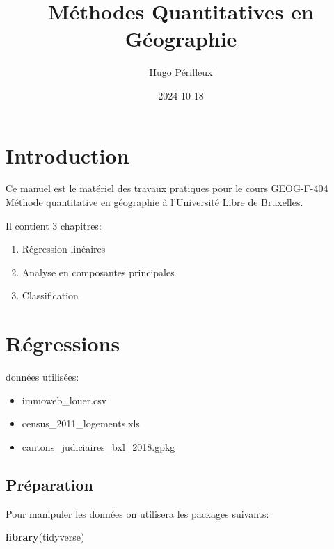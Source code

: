 \documentclass[
]{book}
\title{Méthodes Quantitatives en Géographie}
\author{Hugo Périlleux}
\date{2024-10-18}
\newenvironment{Shaded}{\begin{snugshade}}{\end{snugshade}}
\newcommand{\FunctionTok}[1]{\textcolor[rgb]{0.13,0.29,0.53}{\textbf{#1}}}
\newcommand{\NormalTok}[1]{#1}
\begin{document}
\maketitle

{
\setcounter{tocdepth}{1}
\tableofcontents
}
\hypertarget{introduction}{%
\chapter*{Introduction}\label{introduction}}

Ce manuel est le matériel des travaux pratiques pour le cours GEOG-F-404 Méthode quantitative en géographie à l'Université Libre de Bruxelles.

Il contient 3 chapitres:

\begin{enumerate}
\def\labelenumi{\arabic{enumi}.}
\item
  Régression linéaires
\item
  Analyse en composantes principales
\item
  Classification
\end{enumerate}

\hypertarget{ruxe9gressions}{%
\chapter{Régressions}\label{ruxe9gressions}}

données utilisées:

\begin{itemize}
\item
  immoweb\_louer.csv
\item
  census\_2011\_logements.xls
\item
  cantons\_judiciaires\_bxl\_2018.gpkg
\end{itemize}

\hypertarget{pruxe9paration}{%
\section{Préparation}\label{pruxe9paration}}

Pour manipuler les données on utilisera les packages suivants:

\begin{Shaded}
\begin{Highlighting}[]
\FunctionTok{library}\NormalTok{(tidyverse)}
\end{Highlighting}
\end{Shaded}
\end{document}
